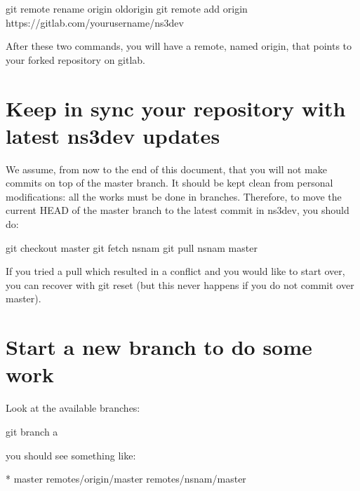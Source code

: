 \documentclass[letterpaper,10pt,english]{sphinxmanual}
\begin{document}
\begin{sphinxVerbatim}[commandchars=\\\{\}]
\PYGZdl{} git remote rename origin old\PYGZhy{}origin
\PYGZdl{} git remote add origin https://gitlab.com/your\PYGZhy{}user\PYGZhy{}name/ns\PYGZhy{}3\PYGZhy{}dev
\end{sphinxVerbatim}

After these two commands, you will have a remote, named origin, that points
to your forked repository on gitlab.


\section{Keep in sync your repository with latest ns\sphinxhyphen{}3\sphinxhyphen{}dev updates}
\label{\detokenize{working-with-git:keep-in-sync-your-repository-with-latest-ns-3-dev-updates}}
We assume, from now to the end of this document, that you will not make commits on top of the master branch. It should be kept clean from  personal modifications: all the works must be done in branches. Therefore, to move the current HEAD of the master branch to the latest commit in ns\sphinxhyphen{}3\sphinxhyphen{}dev, you should do:

\begin{sphinxVerbatim}[commandchars=\\\{\}]
\PYGZdl{} git checkout master
\PYGZdl{} git fetch nsnam
\PYGZdl{} git pull nsnam master
\end{sphinxVerbatim}

If you tried a pull which resulted in a conflict and you would like to start over, you can recover with git reset (but this never happens if you do not commit over master).


\section{Start a new branch to do some work}
\label{\detokenize{working-with-git:start-a-new-branch-to-do-some-work}}
Look at the available branches:

\begin{sphinxVerbatim}[commandchars=\\\{\}]
\PYGZdl{} git branch \PYGZhy{}a
\end{sphinxVerbatim}

you should see something like:

\begin{sphinxVerbatim}[commandchars=\\\{\}]
* master
  remotes/origin/master
  remotes/nsnam/master
\end{sphinxVerbatim}
\end{document}
